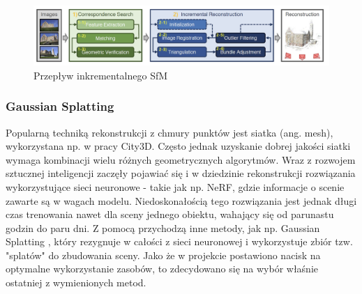 \begin{figure}[!ht]
  \includegraphics[width=\linewidth]{img/sfm_pipeline.png}
  \caption{Przepływ inkrementalnego SfM}
  \label{fig:sfm_flow}
\end{figure}

\subsubsection{Gaussian Splatting}

Popularną techniką rekonstrukcji z chmury punktów jest siatka (ang. mesh), wykorzystana np. w pracy City3D\cite{city3D}. Często jednak uzyskanie dobrej jakości siatki wymaga kombinacji wielu różnych geometrycznych algorytmów. Wraz z rozwojem sztucznej inteligencji zaczęły pojawiać się i w dziedzinie rekonstrukcji rozwiązania wykorzystujące sieci neuronowe - takie jak np. NeRF\cite{nerf}, gdzie informacje o scenie zawarte są w wagach modelu. Niedoskonałością tego rozwiązania jest jednak długi czas trenowania nawet dla sceny jednego obiektu, wahający się od parunastu godzin do paru dni. Z pomocą przychodzą inne metody, jak np. Gaussian Splatting \cite{gaussiansplatting}, który rezygnuje w całości z sieci neuronowej i wykorzystuje zbiór tzw. "splatów" do zbudowania sceny. Jako że w projekcie postawiono nacisk na optymalne wykorzystanie zasobów, to zdecydowano się na wybór właśnie ostatniej z wymienionych metod. 

